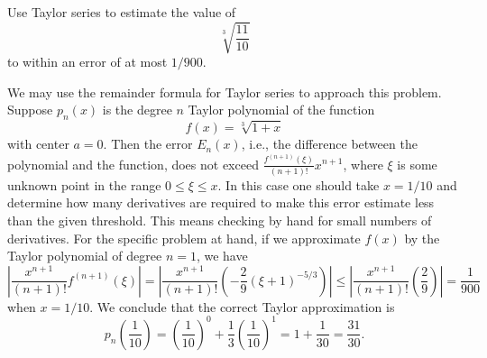 \documentclass{ximera}
\begin{document}
\begin{question}%

Use Taylor series to estimate the value of
\[\sqrt[3]{\frac{11}{10}}\] to within an error of at most \(1/900\).
\begin{multiplechoice}
\end{multiplechoice}
\begin{feedback}
We may use the remainder formula for Taylor series to approach this problem.
Suppose \(p_n(x)\) is the degree \(n\) Taylor polynomial of the function
\[ f(x) = \sqrt[3]{1+x}\]
with center \(a=0\). Then the error \(E_n(x)\), i.e., the difference between the polynomial and the function, does not exceed \(\frac{f^{(n+1)}(\xi)}{(n+1)!}x^{n+1}\), where \(\xi\) is some unknown point  in the range \(0 \leq \xi \leq x\). In this case one should take \(x = 1/10\) and determine how many derivatives are required to make this error estimate less than the given threshold. This means checking by hand for small numbers of derivatives. For the specific problem at hand, if we approximate \(f(x)\) by the Taylor polynomial of degree \( n = 1\), we have 
\[ \left| \frac{x^{n+1} }{(n+1)!} f^{(n+1)}(\xi) \right| = \left| \frac{x^{n+1}}{(n+1)!} \left( -\frac{2}{9} (\xi+1)^{-5/3} \right) \right| \leq \left| \frac{x^{n+1}}{(n+1)!} \left( \frac{2}{9} \right) \right| = \frac{1}{900} \] when \(x = 1/10\).
We conclude that the correct Taylor approximation is
\[ p_n \left( \frac{1}{10}\right) =  \left(\frac{1}{10}\right)^{0} + \frac{1}{3}\left(\frac{1}{10}\right)^{1} =  1 + \frac{1}{30} = \frac{31}{30}.\]
\end{feedback}

\end{question}
\end{document}
